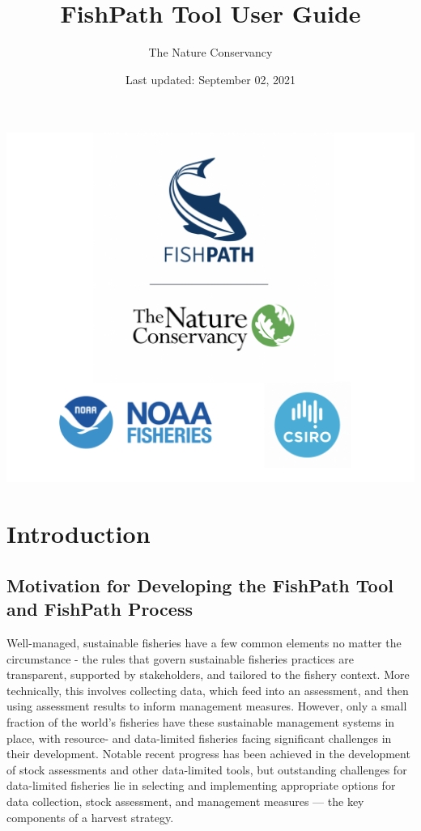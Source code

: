 \documentclass[
  11pt,
]{book}
\title{FishPath Tool User Guide}
\author{The Nature Conservancy}
\date{Last updated: September 02, 2021}
\begin{document}
\maketitle

{
\setcounter{tocdepth}{1}
\tableofcontents
}
\hypertarget{section}{%
\chapter*{}\label{section}}

\begin{center}\includegraphics[width=0.75\linewidth]{images/3-logos} \end{center}

\hypertarget{intro}{%
\chapter{Introduction}\label{intro}}

\hypertarget{motivation}{%
\section{Motivation for Developing the FishPath Tool and FishPath Process}\label{motivation}}

Well-managed, sustainable fisheries have a few common elements no matter the circumstance - the rules that govern sustainable fisheries practices are transparent, supported by stakeholders, and tailored to the fishery context. More technically, this involves collecting data, which feed into an assessment, and then using assessment results to inform management measures. However, only a small fraction of the world's fisheries have these sustainable management systems in place, with resource- and data-limited fisheries facing significant challenges in their development. Notable recent progress has been achieved in the development of stock assessments and other data-limited tools, but outstanding challenges for data-limited fisheries lie in selecting and implementing appropriate options for data collection, stock assessment, and management measures --- the key components of a harvest strategy.
\end{document}
